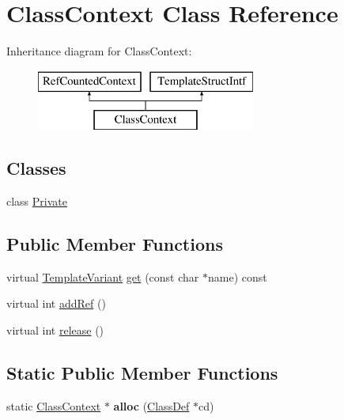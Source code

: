 \hypertarget{class_class_context}{}\section{Class\+Context Class Reference}
\label{class_class_context}
Inheritance diagram for Class\+Context\+:\begin{figure}[H]
\begin{center}
\leavevmode
\includegraphics[height=2.000000cm]{class_class_context}
\end{center}
\end{figure}
\subsection*{Classes}
\begin{DoxyCompactItemize}
\item 
class \mbox{\hyperlink{class_class_context_1_1_private}{Private}}
\end{DoxyCompactItemize}
\subsection*{Public Member Functions}
\begin{DoxyCompactItemize}
\item 
virtual \mbox{\hyperlink{class_template_variant}{Template\+Variant}} \mbox{\hyperlink{class_class_context_a7826818c79646d8fcdadfcab5f1c2cc5}{get}} (const char $\ast$name) const
\item 
virtual int \mbox{\hyperlink{class_class_context_acb15feacf639082eca1d686f54dec3db}{add\+Ref}} ()
\item 
virtual int \mbox{\hyperlink{class_class_context_a0be571acb1fbb5bf559fda7daad05a36}{release}} ()
\end{DoxyCompactItemize}
\subsection*{Static Public Member Functions}
\begin{DoxyCompactItemize}
\item 
\mbox{\label{class_class_context_a88d70584244511b67166f983fdb58b2e}} 
static \mbox{\hyperlink{class_class_context}{Class\+Context}} $\ast$ {\bfseries alloc} (\mbox{\hyperlink{class_class_def}{Class\+Def}} $\ast$cd)
\end{DoxyCompactItemize}


